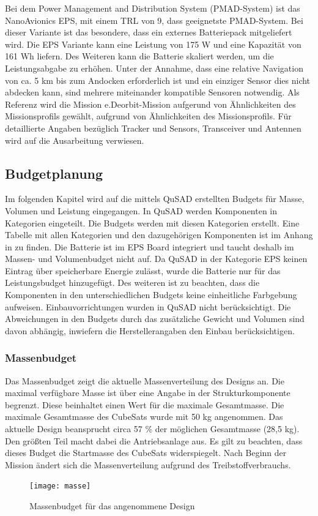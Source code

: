 	Bei dem Power Management and Distribution System (PMAD-System) ist das NanoAvionics EPS, mit einem TRL von 9, dass geeignetste PMAD-System. Bei dieser Variante ist das besondere, dass ein externes Batteriepack mitgeliefert wird. Die EPS Variante kann eine Leistung von 175 W und eine Kapazität von 161 Wh liefern. Des Weiteren kann die Batterie skaliert werden, um die Leistungsabgabe zu erhöhen. Unter der Annahme, dass eine relative Navigation von ca. 5 km bis zum Andocken erforderlich ist und ein einziger Sensor dies nicht abdecken kann, sind mehrere miteinander kompatible Sensoren notwendig. Als Referenz wird die Mission e.Deorbit-Mission aufgerund von Ähnlichkeiten des Missionsprofils gewählt, aufgrund von Ähnlichkeiten des Missionsprofils. Für detaillierte Angaben bezüglich Tracker und Sensors, Transceiver und Antennen wird auf die Ausarbeitung \cite{Lettau.} verwiesen.
	
				\subsection{Budgetplanung}
Im folgenden Kapitel wird auf die mittels QuSAD erstellten Budgets für Masse, Volumen und Leistung eingegangen. In QuSAD werden Komponenten in Kategorien eingeteilt. Die Budgets werden mit diesen Kategorien erstellt. Eine Tabelle mit allen Kategorien und den dazugehörigen Komponenten ist im Anhang in  zu finden. Die Batterie ist im EPS Board integriert und taucht deshalb im Massen- und Volumenbudget nicht auf. Da QuSAD in der Kategorie EPS keinen Eintrag über speicherbare Energie zulässt, wurde die Batterie nur für das Leistungsbudget hinzugefügt. Des weiteren ist zu beachten, dass die Komponenten in den unterschiedlichen Budgets keine einheitliche Farbgebung aufweisen. Einbauvorrichtungen wurden in QuSAD nicht berücksichtigt. Die Abweichungen in den Budgets durch das  zusätzliche Gewicht und Volumen sind davon abhängig, inwiefern die Herstellerangaben den Einbau berücksichtigen.\\

						\subsubsection{Massenbudget}
Das Massenbudget  zeigt die aktuelle Massenverteilung des Designs an. Die maximal verfügbare Masse ist über eine Angabe in der Strukturkomponente begrenzt. Diese beinhaltet einen Wert für die maximale Gesamtmasse. Die maximale Gesamtmasse des CubeSats wurde mit 50 kg angenommen. Das aktuelle Design beansprucht circa 57 \% der möglichen Gesamtmasse (28,5 kg). Den größten Teil macht dabei die Antriebsanlage aus. Es gilt zu beachten, dass dieses Budget die Startmasse des CubeSats widerspiegelt. Nach Beginn der Mission ändert sich die Massenverteilung aufgrund des Treibstoffverbrauchs.\\
										\begin{figure}[!h]
											\centering
												\texttt{[image: masse]}
											\caption{Massenbudget für das angenommene Design}
											\label{fig:masse}
										\end{figure}
\newpage								
